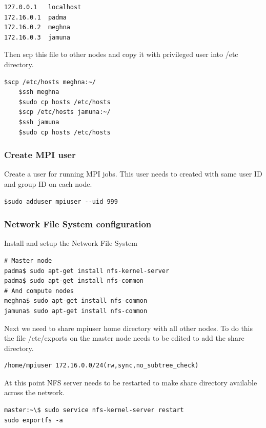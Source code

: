 \begin{lstlisting}[style=BashInputStyle]	
127.0.0.1	localhost
172.16.0.1	padma
172.16.0.2	meghna
172.16.0.3	jamuna
\end{lstlisting}

Then scp this file to other nodes and copy it with privileged user into /etc directory.

\begin{lstlisting}[style=BashInputStyle]
	$scp /etc/hosts meghna:~/
	$ssh meghna
	$sudo cp hosts /etc/hosts
	$scp /etc/hosts jamuna:~/
	$ssh jamuna
	$sudo cp hosts /etc/hosts
\end{lstlisting}

\subsubsection{Create MPI user}
Create a user for running MPI jobs. This user needs to created with same user ID and group ID on each node.

\begin{lstlisting}[style=BashInputStyle]
	$sudo adduser mpiuser --uid 999
\end{lstlisting}

\subsubsection{Network File System configuration}

Install and setup the Network File System
\begin{lstlisting}[style=BashInputStyle]
# Master node
padma$ sudo apt-get install nfs-kernel-server
padma$ sudo apt-get install nfs-common
# And compute nodes
meghna$ sudo apt-get install nfs-common
jamuna$ sudo apt-get install nfs-common
\end{lstlisting}

Next we need to share mpiuser home directory with all other nodes. To do this the file /etc/exports on the master node needs to be edited to add the share directory.

\begin{lstlisting}[style=BashInputStyle]
	/home/mpiuser 172.16.0.0/24(rw,sync,no_subtree_check)
\end{lstlisting}


At this point NFS server needs to be restarted to make share directory available across the network.

\begin{lstlisting}[style=BashInputStyle]
master:~\$ sudo service nfs-kernel-server restart
sudo exportfs -a
\end{lstlisting}

